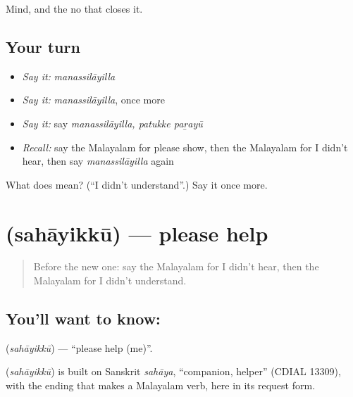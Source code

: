 \begin{grammarlens}[title={What you've built}]
Mind, and the no that closes it.
\end{grammarlens}

\subsection*{Your turn}
\begin{itemize}
\raggedright
  \item \emph{Say it:} \emph{manassilāyilla}
  \item \emph{Say it:} \emph{manassilāyilla}, once more
  \item \emph{Say it:} say \emph{manassilāyilla, patukke paṟayū}
  \item \emph{Recall:} say the Malayalam for please show, then the Malayalam for I didn't hear, then say \emph{manassilāyilla} again
\end{itemize}

\begin{tcolorbox}[breakable,colback=teal!4,colframe=teal!35!black,title={Before you move on}]
What does  mean? (\textquotedblleft{}I didn't understand\textquotedblright{}.) Say it once more.
\end{tcolorbox}
\section[\texorpdfstring{\ml{സഹായിക്കൂ} (sahāyikkū)}{സഹായിക്കൂ (sahāyikkū)}]{ (sahāyikkū) — please help}

\label{lesson:ML-C120-help}



\begin{quote}
Before the new one: say the Malayalam for I didn't hear, then the Malayalam for I didn't understand.
\end{quote}

\subsection*{You'll want to know: }
\textbf{} (\emph{sahāyikkū}) — \textquotedblleft{}please help (me)\textquotedblright{}.

\begin{cousinweb}
\textbf{} (\emph{sahāyikkū}) is built on Sanskrit \emph{sahāya}, \textquotedblleft{}companion, helper\textquotedblright{} (CDIAL 13309), with the ending that makes a Malayalam verb, here in its request form.
\end{cousinweb}

